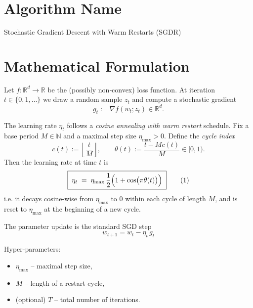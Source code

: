 \documentclass{article}
\begin{document}
\section*{Algorithm Name}
Stochastic Gradient Descent with Warm Restarts (SGDR)

\section*{Mathematical Formulation}
Let $f:\mathbb{R}^d\rightarrow\mathbb{R}$ be the (possibly non‑convex) loss function.
At iteration $t\in\{0,1,\dots\}$ we draw a random sample $z_t$ and compute a stochastic
gradient 
\[
g_t:=\nabla f(w_t;z_t)\in\mathbb{R}^d .
\]

The learning rate $\eta_t$ follows a \emph{cosine annealing with warm restart}
schedule.  Fix a base period $M\in\mathbb{N}$ and a maximal step size
$\eta_{\max}>0$.  Define the \emph{cycle index}
\[
c(t):=\left\lfloor\frac{t}{M}\right\rfloor,\qquad
\theta(t):=\frac{t-Mc(t)}{M}\in[0,1).
\]
Then the learning rate at time $t$ is
\[
\boxed{\;
\eta_t \;=\; \eta_{\max}\,
\frac{1}{2}\Bigl(1+\cos\bigl(\pi\theta(t)\bigr)\Bigr)
\;}
\tag{1}
\]
i.e. it decays cosine‑wise from $\eta_{\max}$ to $0$ within each cycle of length $M$,
and is reset to $\eta_{\max}$ at the beginning of a new cycle.

The parameter update is the standard SGD step
\[
\boxed{\;
w_{t+1}=w_t-\eta_t\,g_t
\;}
\tag{2}
\]

Hyper‑parameters:
\begin{itemize}
  \item $\eta_{\max}$ – maximal step size,
  \item $M$ – length of a restart cycle,
  \item (optional) $T$ – total number of iterations.
\end{itemize}

\end{document}
